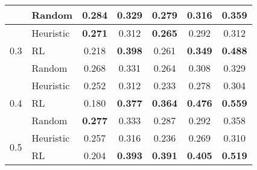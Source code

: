 \begin{table}[!h]
\begin{tabular}{cl|cccc|c}
 & Random & \cellcolor[HTML]{b9d5ea} \color{black} 0.284 & \cellcolor[HTML]{fee7d1} \color{black} 0.329 & \cellcolor[HTML]{e7f5e2} \color{black} 0.279 & \cellcolor[HTML]{fdd6c5} \color{black} 0.316 & \cellcolor[HTML]{f1f1f1} \color{black} 0.359 \\
\midrule
\multirow[c]{3}{*}{0.3} & Heuristic & \cellcolor[HTML]{bfd8ec} \color{black} \textbf{0.271} & \cellcolor[HTML]{feebd8} \color{black} 0.312 & \cellcolor[HTML]{eaf7e6} \color{black} \textbf{0.265} & \cellcolor[HTML]{fee0d2} \color{black} 0.292 & \cellcolor[HTML]{f7f7f7} \color{black} 0.312 \\
 & RL & \cellcolor[HTML]{d2e3f3} \color{black} 0.218 & \cellcolor[HTML]{fdd1a5} \color{black} \textbf{0.398} & \cellcolor[HTML]{ebf7e7} \color{black} 0.261 & \cellcolor[HTML]{fcc7b1} \color{black} \textbf{0.349} & \cellcolor[HTML]{d8d8d8} \color{black} \textbf{0.488} \\
 & Random & \cellcolor[HTML]{c1d9ed} \color{black} 0.268 & \cellcolor[HTML]{fee7d0} \color{black} 0.331 & \cellcolor[HTML]{ebf7e7} \color{black} 0.264 & \cellcolor[HTML]{fddaca} \color{black} 0.308 & \cellcolor[HTML]{f6f6f6} \color{black} 0.329 \\
\midrule
\multirow[c]{3}{*}{0.4} & Heuristic & \cellcolor[HTML]{c8dcef} \color{black} 0.252 & \cellcolor[HTML]{feebd8} \color{black} 0.312 & \cellcolor[HTML]{f2faef} \color{black} 0.233 & \cellcolor[HTML]{fee4d8} \color{black} 0.278 & \cellcolor[HTML]{f9f9f9} \color{black} 0.304 \\
 & RL & \cellcolor[HTML]{deebf7} \color{black} 0.180 & \cellcolor[HTML]{fdd8b3} \color{black} \textbf{0.377} & \cellcolor[HTML]{c5e8be} \color{black} \textbf{0.364} & \cellcolor[HTML]{fb8a6a} \color{black} \textbf{0.476} & \cellcolor[HTML]{c8c8c8} \color{black} \textbf{0.559} \\
 & Random & \cellcolor[HTML]{bcd7eb} \color{black} \textbf{0.277} & \cellcolor[HTML]{fee6cf} \color{black} 0.333 & \cellcolor[HTML]{e4f4df} \color{black} 0.287 & \cellcolor[HTML]{fee1d3} \color{black} 0.292 & \cellcolor[HTML]{f2f2f2} \color{black} 0.358 \\
\midrule
\multirow[c]{3}{*}{0.5} & Heuristic & \cellcolor[HTML]{c6dbef} \color{black} 0.257 & \cellcolor[HTML]{feead6} \color{black} 0.316 & \cellcolor[HTML]{f1faef} \color{black} 0.236 & \cellcolor[HTML]{fee6db} \color{black} 0.269 & \cellcolor[HTML]{f8f8f8} \color{black} 0.310 \\
 & RL & \cellcolor[HTML]{d7e6f4} \color{black} 0.204 & \cellcolor[HTML]{fdd3a8} \color{black} \textbf{0.393} & \cellcolor[HTML]{b7e2b0} \color{black} \textbf{0.391} & \cellcolor[HTML]{fcad91} \color{black} \textbf{0.405} & \cellcolor[HTML]{d1d1d1} \color{black} \textbf{0.519} \\

\end{tabular}
\end{table}
